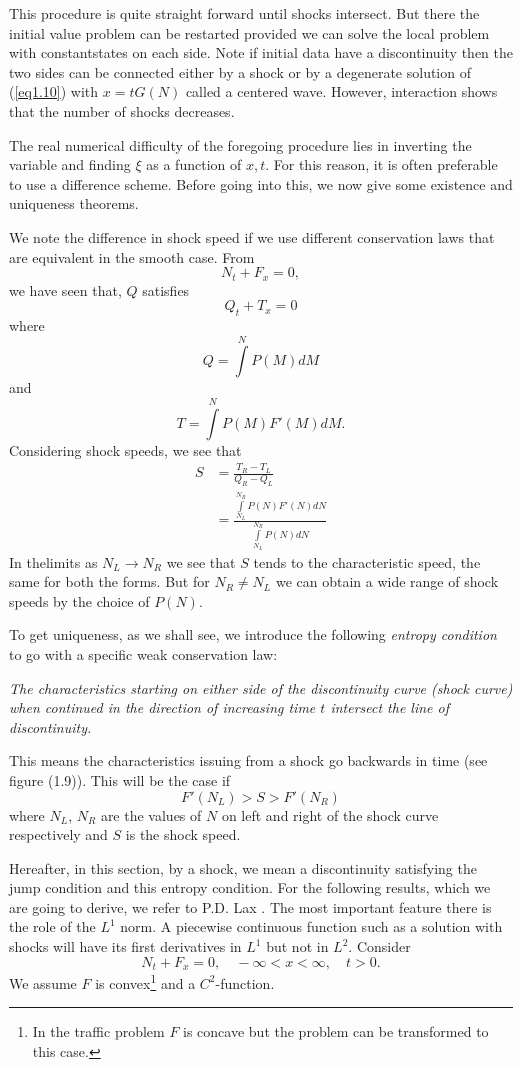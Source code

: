 This procedure is quite straight forward until shocks intersect. But there the initial value problem can be restarted provided we can solve the local problem with 
constant\pageoriginale states on each side. Note if initial data have a discontinuity then the two sides can be connected either by a shock or by a degenerate solution of (\ref{eq1.10}) with $x = t G(N)$ called  a centered wave. However, interaction shows that the number of shocks decreases.

The real numerical difficulty of the foregoing procedure lies in inverting the variable and finding $\xi$ as a function of $x,t$. For this reason, it is often preferable to use a difference scheme. Before going into this, we now give some existence and uniqueness theorems. 

\begin{remarks*}
We note the difference in shock speed if we use different conservation laws that are equivalent in the smooth case. From
$$
N_t + F_x = 0,
$$
we have seen that, $Q$ satisfies
$$
Q_t + T_x =0
$$
where
$$
Q = \int\limits^N P(M) dM
$$
and 
$$
T = \int\limits^N P(M) F'(M) dM. 
$$
Considering shock speeds, we see that 
\begin{align*}
S & = \frac{T_R - T_L}{Q_R - Q_L}\\
& = \frac{\int\limits^{N_R}_{N_L} P(N) F' (N) dN}{\int\limits^{N_R}_{N_L} P(N) dN}
\end{align*}
 In the\pageoriginale limits as $N_L \to N_R$ we see that $S$ tends to the characteristic speed, the same for both the forms. But for $N_R \neq N_L$ we can obtain a wide range of shock speeds by the choice of $P(N)$. 
\end{remarks*}

To get uniqueness, as we shall see, we introduce the following {\em entropy condition} to go with a specific weak conservation law:

{\em The characteristics starting on either side of the discontinuity curve (shock curve) when continued in the direction of increasing time $t$ intersect the line of discontinuity.}

This means the characteristics issuing from a shock go backwards in time (see figure (1.9)). This will be the case if 
$$
F' (N_L) > S > F' (N_R) 
$$
where $N_L$, $N_R$ are the values of $N$ on left and right of the shock curve respectively and $S$ is the shock speed. 

Hereafter, in this section, by a shock, we mean a discontinuity satisfying the jump condition and this entropy condition. For the following results, which we are going to derive, we refer to P.D. Lax \cite{key23}. The most important feature there is the role of the $L^1$ norm. A piecewise continuous function such as a solution with shocks will have its first derivatives in $L^1$ but not in $L^2$. Consider
\begin{equation*}
N_t + F_x = 0, \quad -\infty < x < \infty, \quad t  > 0. 
\tag{1.14}\label{eq1.14}
\end{equation*}
We assume $F$ is convex\footnote{In the traffic problem $F$ is concave but the problem can be transformed to this case.} and a $C^2$-function.

